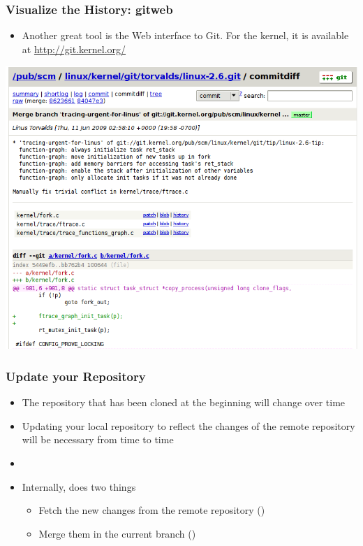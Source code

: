 \begin{frame}
  \frametitle{Visualize the History: gitweb}
  \begin{itemize}
  \item Another great tool is the Web interface to Git. For the
    kernel, it is available at \url{http://git.kernel.org/}
  \end{itemize}
  \begin{center}
    \includegraphics[height=0.7\textheight]{slides/kernel-git-content/gitweb.png}
  \end{center}
\end{frame}

\begin{frame}
  \frametitle{Update your Repository}
  \begin{itemize}
  \item The repository that has been cloned at the beginning will
    change over time
  \item Updating your local repository to reflect the changes of the
    remote repository will be necessary from time to time
  \item {}
  \item Internally, does two things
    \begin{itemize}
    \item Fetch the new changes from the remote repository
      ()
    \item Merge them in the current branch ()
    \end{itemize}
  \end{itemize}
\end{frame}

